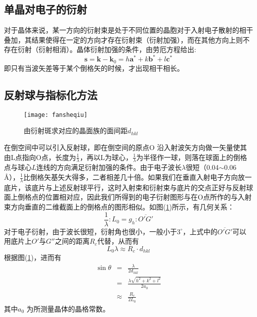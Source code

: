 \documentclass[aps,pre,12pt,preprint,onecolumn,showpacs,showkeys]{revtex4-1}
\def \degree {^\circ}
\begin{document}
    \subsection{单晶对电子的衍射}
        对于晶体来说，某一方向的衍射束是处于不同位置的晶胞对于入射电子散射的相干叠加，其结果使得在一定的方向才存在衍射束（衍射加强），而在其他方向上则不存在衍射（衍射相消）。晶体衍射加强的条件，由劳厄方程给出:
        \begin{equation}
            \bm s=\bm k - \bm k_0= h \bm{a}^*+k \bm{b}^*+l \bm{c}^*
        \end{equation}
        即只有当波矢差等于某个倒格矢的时候，才出现相干相长。
    \subsection{反射球与指标化方法}\label{sec:indices}
        \begin{figure}[ht]
        \centering
        \texttt{[image: fansheqiu]}
        \caption{\label{fig:fansheqiu}%
        由衍射斑求对应的晶面族的面间距$d_{hkl}$}
        \end{figure}
        在倒空间中可以引入反射球，即在倒空间的原点O 沿入射波矢方向做一矢量使其由L点指向O点，长度为$\frac{1}{\lambda}$，再以L为球心，$\frac{1}{\lambda}$为半径作一球，则落在球面上的倒格点与球心$L$连线的方向满足衍射加强的条件。由于电子波长$\lambda$很短（0.04$\sim$0.06 \AA），$\frac{1}{\lambda}$比倒格矢基矢大得多，二者相差几十倍。如果我们在垂直入射电子方向放一底片，该底片与上述反射球平行，这时入射束和衍射束与底片的交点正好与反射球面上倒格点的位置相对应，因此我们所得到的电子衍射图形与在O点所作的与入射束方向垂直的二维截面上的倒格点的图形相似。如图(\ref{fig:fansheqiu})所示，有几何关系：
        \begin{equation}
            \frac{1}{\lambda}:L_0=g_h:\overline{O'G'}
        \end{equation}
        对于电子衍射，由于波长很短，衍射角也很小，一般小于$3\degree$，上式中的$\overline{O'G'}$可以用底片上$O'$与$G''$之间的距离$R_c$代替，从而有
        \begin{equation}
            L_0 \lambda \approx R_c \cdot d_{hkl} 
        \end{equation}
        根据图(\ref{fig:fansheqiu})，进而有
        \begin{eqnarray}
            \sin \theta &=&\frac{\lambda}{2 d_{hkl}}\\
            &=&\frac{\lambda \sqrt{h^2+k^2+l^2}}{2 a_0}\label{eq:bragg}\\
            &\approx& \frac{R_c}{2 L_0}
        \end{eqnarray}
        其中$a_0$ 为所测量晶体的晶格常数。
\end{document}
